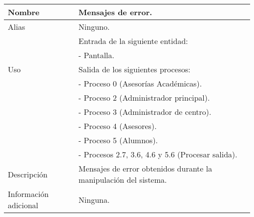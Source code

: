 \begin{center}
  \begin{tabular}{| l | p{9cm} |}
    \hline
    Nombre & \textbf{Mensajes de error}.\\
    \hline
    Alias & Ninguno.\\
    \hline
    \multirow{5}{*}{Uso} & Entrada de la siguiente entidad:\\
                         & - Pantalla.\\
                         & Salida de los siguientes procesos:\\
                         & - Proceso 0 (Asesorías Académicas).\\
                         & - Proceso 2 (Administrador principal).\\
                         & - Proceso 3 (Administrador de centro).\\
                         & - Proceso 4 (Asesores).\\
                         & - Proceso 5 (Alumnos).\\
                         & - Procesos 2.7, 3.6, 4.6 y 5.6 (Procesar salida).\\
    \hline
    Descripción & Mensajes de error obtenidos durante la manipulación del
                  sistema.\\
    \hline
    Información adicional & Ninguna.\\
    \hline
  \end{tabular}
\end{center}
